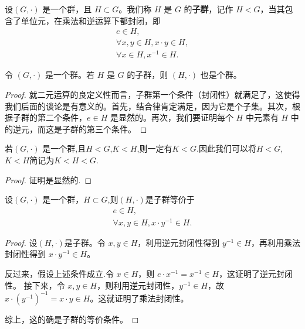 \documentclass[../../main.tex]{subfiles}
\begin{document}
\begin{definition}[子群]
设$(G, \cdot)$ 是一个群，且 $H \subset G$。我们称 $H$ 是 $G$ 的\textbf{子群}，记作 $H < G$，当其包含了单位元，在乘法和逆运算下都封闭，即
\begin{gather*}
e \in H ,\\
\forall x, y \in H, x \cdot y \in H ,\\
\forall x \in H, x^{-1} \in H.
\end{gather*} 
\end{definition}

\begin{proposition}[子群也是群]
令 $(G, \cdot)$ 是一个群。若 $H$ 是 $G$ 的子群，则 $(H, \cdot)$ 也是个群。
\end{proposition}
\begin{proof}
就二元运算的良定义性而言，子群第一个条件（封闭性）就满足了，这使得我们后面的谈论是有意义的。首先，结合律肯定满足，因为它是个子集。其次，根据子群的第二个条件，$e \in H$ 是显然的。再次，我们要证明每个 $H$ 中元素有 $H$ 中的逆元，而这是子群的第三个条件。

\end{proof}

\begin{corollary}[子群的传递性]
若$(G, \cdot)$ 是一个群,且$H<G$,$K<H$,则一定有$K<G$.因此我们可以将$H<G$,$K<H$简记为$K<H<G$.
\end{corollary}
\begin{proof}
证明是显然的.

\end{proof}

\begin{proposition}[子群的等价条件]\label{proposition:子群的等价条件}
设$(G, \cdot)$ 是一个群，$H\subset G$,则$(H,\cdot)$是子群等价于
\begin{gather*}
e \in H,\\
\forall x, y \in H, x \cdot y^{-1} \in H .
\end{gather*}
\end{proposition}
\begin{proof}
设$(H,\cdot)$是子群。令 $x, y \in H$，利用逆元封闭性得到 $y^{-1} \in H$，再利用乘法封闭性得到 $x \cdot y^{-1} \in H$。

反过来，假设上述条件成立.令 $x \in H$，则 $e \cdot x^{-1} = x^{-1} \in H$，这证明了逆元封闭性。
接下来，令 $x, y \in H$，则利用逆元封闭性，$y^{-1} \in H$，故 $x \cdot (y^{-1})^{-1} = x \cdot y \in H$。这就证明了乘法封闭性。

综上，这的确是子群的等价条件。

\end{proof}
\end{document}
